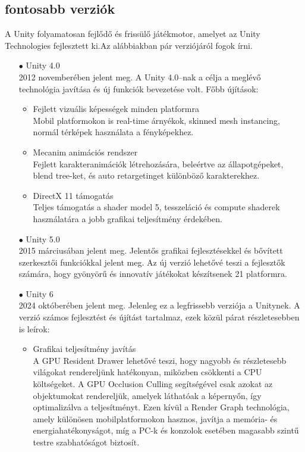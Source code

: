 \documentclass[
]{thesis-ekf}
\theoremstyle{definition}
\theoremstyle{remark}
\begin{document}
\subsection{fontosabb verziók}
A Unity folyamatosan fejlődő és frissülő játékmotor, amelyet az Unity Technologies fejlesztett ki.Az alábbiakban pár verziójáról fogok írni.
\begin{itemize}
	\item[$\bullet$]Unity 4.0\\2012 novemberében jelent meg. A Unity 4.0--nak a célja a meglévő technológia javítása és új funkciók bevezetése volt. Főbb újítások:
	\begin{itemize}
		\item Fejlett vizuális képességek minden platformra\\Mobil platformokon is real-time árnyékok, skinned mesh instancing, normál térképek használata a fényképekhez.
		\item Mecanim animációs rendszer \\ Fejlett karakteranimációk létrehozására, beleértve az állapotgépeket, blend tree-ket, és auto retargetinget különböző karakterekhez.
		\item DirectX 11 támogatás \\ Teljes támogatás a shader model 5, tesszeláció és compute shaderek használatára a jobb grafikai teljesítmény érdekében.
	\end{itemize}
	\item[$\bullet$]Unity 5.0\\2015 márciusában jelent meg. Jelentős grafikai fejlesztésekkel és bővített szerkesztői funkciókkal jelent meg. Az új verzió lehetővé teszi a fejlesztők számára, hogy gyönyörű és innovatív játékokat készítsenek 21 platformra.
	\item[$\bullet$]Unity 6\\2024 októberében jelent meg. Jelenleg ez a legfrissebb verziója a Unitynek. A verzió számos fejlesztést és újítást tartalmaz, ezek közül párat részletesebben is leírok:
	\begin{itemize}
		\item Grafikai teljesítmény javítás \\A GPU Resident Drawer lehetővé teszi, hogy nagyobb és részletesebb világokat rendereljünk hatékonyan, miközben csökkenti a CPU költségeket. A GPU Occlusion Culling segítségével csak azokat az objektumokat rendereljük, amelyek láthatóak a képernyőn, így optimalizálva a teljesítményt. Ezen kívül a Render Graph technológia, amely különösen mobilplatformokon hasznos, javítja a memória- és energiahatékonyságot, míg a PC-k és konzolok esetében magasabb szintű testre szabhatóságot biztosít.

\end{itemize}
\end{itemize}
\end{document}
